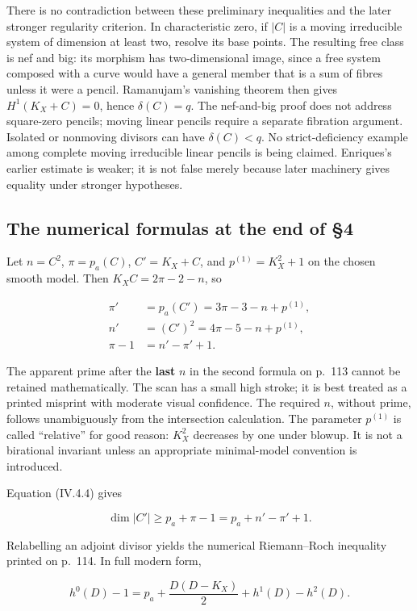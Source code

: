 There is no contradiction between these preliminary inequalities and the later stronger regularity criterion. In characteristic zero, if \(|C|\) is a moving irreducible system of dimension at least two, resolve its base points. The resulting free class is nef and big: its morphism has two-dimensional image, since a free system composed with a curve would have a general member that is a sum of fibres unless it were a pencil. Ramanujam's vanishing theorem then gives \(H^1(K_X+C)=0\), hence \(\delta(C)=q\). The nef-and-big proof does not address square-zero pencils; moving linear pencils require a separate fibration argument. Isolated or nonmoving divisors can have \(\delta(C)<q\). No strict-deficiency example among complete moving irreducible linear pencils is being claimed. Enriques's earlier estimate is weaker; it is not false merely because later machinery gives equality under stronger hypotheses.

\subsection{The numerical formulas at the end of §4}

Let \(n=C^2\), \(\pi=p_a(C)\), \(C'=K_X+C\), and \(p^{(1)}=K_X^2+1\) on the chosen smooth model. Then \(K_X C=2\pi-2-n\), so

\[
 \begin{aligned}
 \pi'&=p_a(C')=3\pi-3-n+p^{(1)},\\
 n'&=(C')^2=4\pi-5-n+p^{(1)},\\
 \pi-1&=n'-\pi'+1.
 \end{aligned}
\]

The apparent prime after the \textbf{last} \(n\) in the second formula on p.~113 cannot be retained mathematically. The scan has a small high stroke; it is best treated as a printed misprint with moderate visual confidence. The required \(n\), without prime, follows unambiguously from the intersection calculation. The parameter \(p^{(1)}\) is called ``relative'' for good reason: \(K_X^2\) decreases by one under blowup. It is not a birational invariant unless an appropriate minimal-model convention is introduced.

Equation (IV.4.4) gives

\[
 \dim|C'|\geq p_a+\pi-1=p_a+n'-\pi'+1.
\]

Relabelling an adjoint divisor yields the numerical Riemann--Roch inequality printed on p.~114. In full modern form,

\[
 h^0(D)-1=p_a+\frac{D(D-K_X)}2+h^1(D)-h^2(D).
\]

